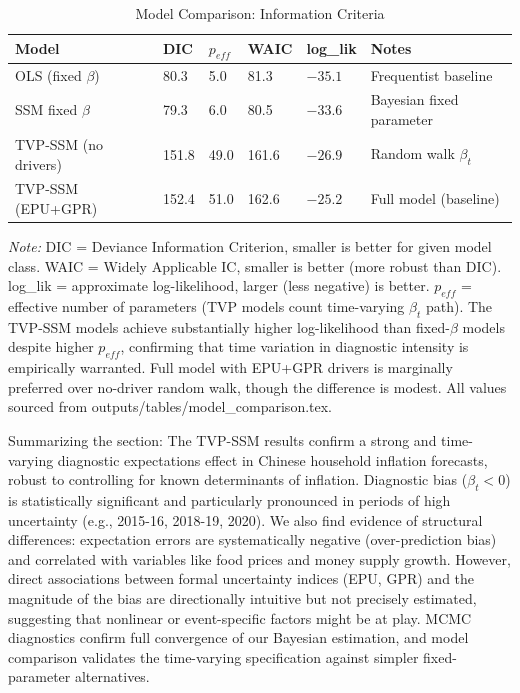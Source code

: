 \documentclass[12pt]{article}
\begin{document}
\begin{table}[!htbp]
    \centering
    \small
    \caption{Model Comparison: Information Criteria}
    \label{tab:model_comp}
    \begin{threeparttable}
        \begin{tabular}{@{}llllll@{}}
            \toprule
            Model                & DIC   & $p_{eff}$ & WAIC  & log\_lik & Notes                    \\
            \midrule
            OLS (fixed $\beta$)  & 80.3  & 5.0       & 81.3  & $-35.1$  & Frequentist baseline     \\
            SSM fixed $\beta$    & 79.3  & 6.0       & 80.5  & $-33.6$  & Bayesian fixed parameter \\
            TVP-SSM (no drivers) & 151.8 & 49.0      & 161.6 & $-26.9$  & Random walk $\beta_t$    \\
            TVP-SSM (EPU+GPR)    & 152.4 & 51.0      & 162.6 & $-25.2$  & Full model (baseline)    \\
            \bottomrule
        \end{tabular}
        \begin{tablenotes}[flushleft]
            \footnotesize
            \item \textit{Note:} DIC = Deviance Information Criterion, smaller is better for given model class. WAIC = Widely Applicable IC, smaller is better (more robust than DIC). log\_lik = approximate log-likelihood, larger (less negative) is better. $p_{eff}$ = effective number of parameters (TVP models count time-varying $\beta_t$ path). The TVP-SSM models achieve substantially higher log-likelihood than fixed-$\beta$ models despite higher $p_{eff}$, confirming that time variation in diagnostic intensity is empirically warranted. Full model with EPU+GPR drivers is marginally preferred over no-driver random walk, though the difference is modest. All values sourced from outputs/tables/model\_comparison.tex.
        \end{tablenotes}
    \end{threeparttable}
\end{table}

Summarizing the section: The TVP-SSM results confirm a strong and time-varying diagnostic expectations effect in Chinese household inflation forecasts, robust to controlling for known determinants of inflation. Diagnostic bias ($\beta_t<0$) is statistically significant and particularly pronounced in periods of high uncertainty (e.g., 2015-16, 2018-19, 2020). We also find evidence of structural differences: expectation errors are systematically negative (over-prediction bias) and correlated with variables like food prices and money supply growth. However, direct associations between formal uncertainty indices (EPU, GPR) and the magnitude of the bias are directionally intuitive but not precisely estimated, suggesting that nonlinear or event-specific factors might be at play. MCMC diagnostics confirm full convergence of our Bayesian estimation, and model comparison validates the time-varying specification against simpler fixed-parameter alternatives.
\end{document}
